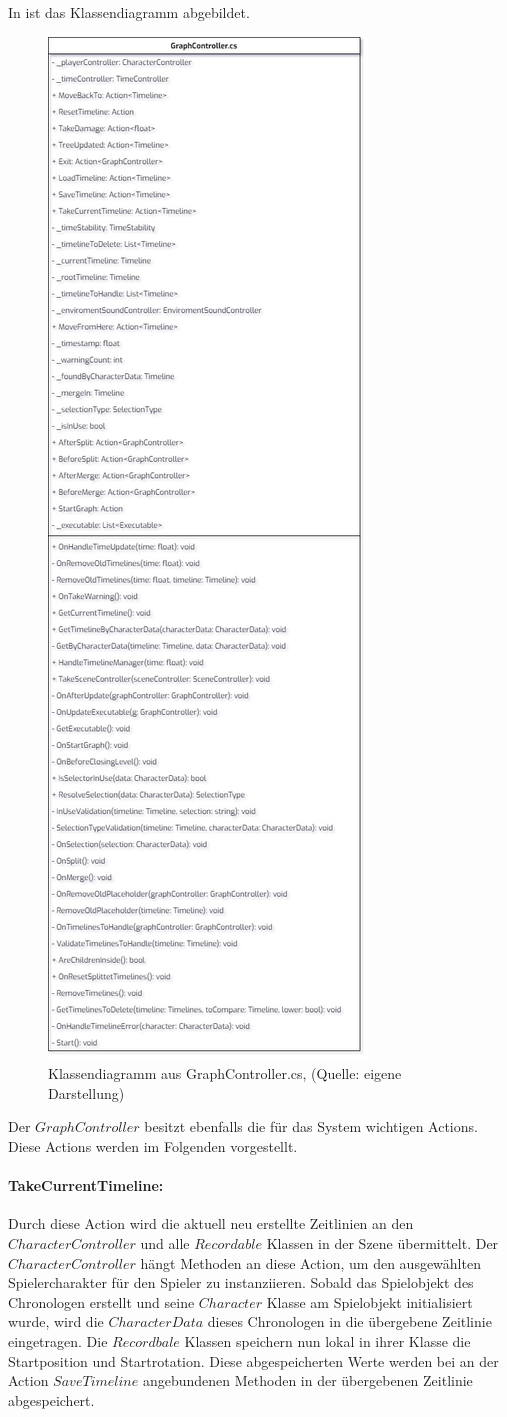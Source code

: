 In  ist das Klassendiagramm abgebildet.
\begin{figure}[p]
\centering
\includegraphics[width=0.5\linewidth]{content/pictures/GraphController.jpg}
\caption{Klassendiagramm aus GraphController.cs, (Quelle: eigene Darstellung)}
\label{fig:graphController-cs}
\end{figure}
Der $GraphController$ besitzt ebenfalls die für das System wichtigen Actions. Diese Actions werden im Folgenden vorgestellt.
\newpage
\paragraph{TakeCurrentTimeline:}
Durch diese Action wird die aktuell neu erstellte Zeitlinien an den $CharacterController$ und alle $Recordable$ Klassen in der Szene übermittelt. Der $CharacterController$ hängt Methoden an diese Action, um den ausgewählten Spielercharakter für den Spieler zu instanziieren. Sobald das Spielobjekt des Chronologen erstellt und seine $Character$ Klasse am Spielobjekt initialisiert wurde, wird die $CharacterData$ dieses Chronologen in die übergebene Zeitlinie eingetragen. 
Die $Recordbale$ Klassen speichern nun lokal in ihrer Klasse die Startposition und Startrotation. Diese abgespeicherten Werte werden bei an der Action $SaveTimeline$ angebundenen Methoden in der übergebenen Zeitlinie abgespeichert.


